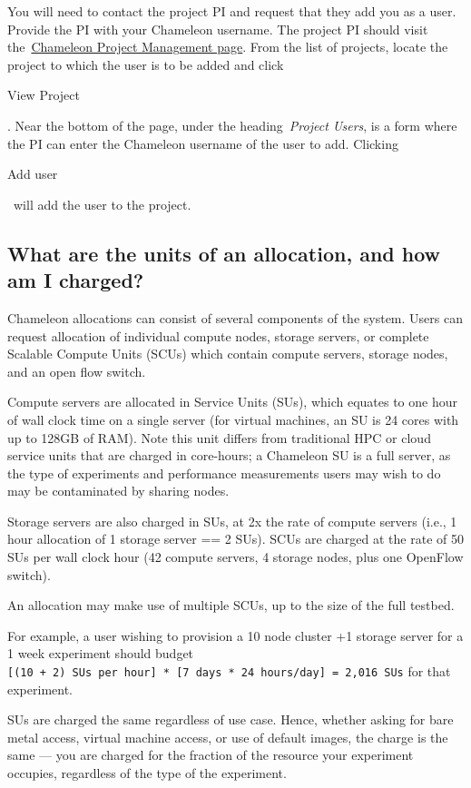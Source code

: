You will need to contact the project PI and request that they add you as
a user. Provide the PI with your Chameleon username. The project PI
should visit
the~\href{https://www.chameleoncloud.org/user/projects}{Chameleon
Project Management page}. From the list of projects, locate the project
to which the user is to be added and click

View Project

. Near the bottom of the page, under the heading~\emph{Project Users},
is a form where the PI can enter the Chameleon username of the user to
add. Clicking

Add user

~will add the user to the project.

\subsection{What are the units of an allocation, and how am I
charged?}\label{what-are-the-units-of-an-allocation-and-how-am-i-charged}

Chameleon allocations can consist of several components of the system.
Users can request allocation of individual compute nodes, storage
servers, or complete Scalable Compute Units (SCUs) which contain compute
servers, storage nodes, and an open flow switch.

Compute servers are allocated in Service Units (SUs), which equates to
one hour of wall clock time on a single server (for virtual machines, an
SU is 24 cores with up to 128GB of RAM). Note this unit differs from
traditional HPC or cloud service units that are charged in core-hours; a
Chameleon SU is a full server, as the type of experiments and
performance measurements users may wish to do may be contaminated by
sharing nodes.

Storage servers are also charged in SUs, at 2x the rate of compute
servers (i.e., 1 hour allocation of 1 storage server == 2 SUs). SCUs are
charged at the rate of 50 SUs per wall clock hour (42 compute servers, 4
storage nodes, plus one OpenFlow switch).

An allocation may make use of multiple SCUs, up to the size of the full
testbed.

For example, a user wishing to provision a 10 node cluster +1 storage
server for a 1 week experiment should budget
\texttt{{[}(10\ +\ 2)\ SUs\ per\ hour{]}\ *\ {[}7\ days\ *\ 24\ hours/day{]}\ =\ 2,016\ SUs}
for that experiment.

SUs are charged the same regardless of use case. Hence, whether asking
for bare metal access, virtual machine access, or use of default images,
the charge is the same --- you are charged for the fraction of the
resource your experiment occupies, regardless of the type of the
experiment.

